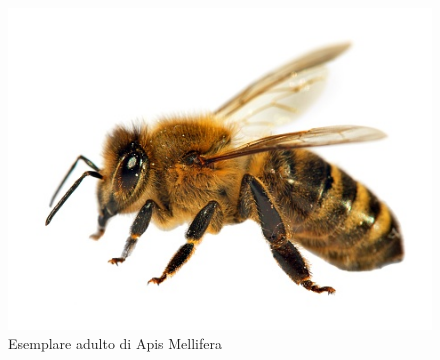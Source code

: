 \begin{figure}[H]
    \centering
    \includegraphics{immagini/capitolo1/apisMellifera.png}
    \caption{Esemplare adulto di Apis Mellifera}
    \label{fig:Apis Mellifera}
\end{figure}


